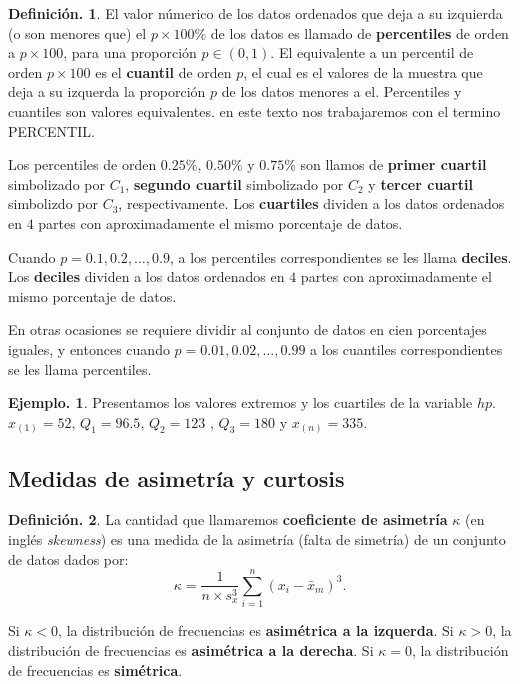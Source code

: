 \documentclass[]{book}
\theoremstyle{definition}
\newtheorem{definition}{Definición.}[chapter]
\theoremstyle{definition}
\newtheorem{example}{Ejemplo.}[chapter]
\theoremstyle{definition}
\theoremstyle{remark}
\begin{document}
\begin{definition}
\protect\hypertarget{def:unnamed-chunk-65}{}{\label{def:unnamed-chunk-65} }
El valor númerico de los datos ordenados que deja a su
izquierda (o son menores que) el \(p \times 100\%\) de los datos es llamado de \textbf{percentiles} de
orden a \(p\times 100\), para una proporción
\(p\in (0,1)\). El equivalente a un percentil de orden
\(p\times 100\) es el \textbf{cuantil} de orden \(p\), el cual es
el
valores de la muestra que deja a su izquerda la
proporción \(p\) de los datos menores a el. Percentiles y
cuantiles son valores equivalentes. en este texto nos
trabajaremos con el termino PERCENTIL.

Los percentiles de orden \(0.25\%\), \(0.50\%\) y \(0.75\%\)
son llamos de \textbf{primer cuartil} simbolizado por \(C_1\),
\textbf{segundo cuartil} simbolizado por \(C_2\) y \textbf{tercer
cuartil} simbolizdo por \(C_3\), respectivamente. Los
\textbf{cuartiles}
dividen a los datos ordenados en \(4\) partes con
aproximadamente el
mismo porcentaje de datos.

Cuando \(p = 0.1, 0.2, \ldots , 0.9\), a los percentiles
correspondientes se les llama \textbf{deciles}. Los
\textbf{deciles} dividen a
los datos ordenados en \(4\) partes con aproximadamente el
mismo
porcentaje de datos.

En otras ocasiones se requiere dividir al conjunto de
datos en cien porcentajes iguales, y
entonces cuando \(p = 0.01, 0.02, \ldots , 0.99\) a los
cuantiles correspondientes se les llama
percentiles.
\end{definition}

\begin{example}
\protect\hypertarget{exm:unnamed-chunk-66}{}{\label{exm:unnamed-chunk-66} }Presentamos los valores extremos y los cuartiles de la
variable \(hp\).
\(x_{(1)}= 52\), \(Q_1= 96.5\), \(Q_2 = 123\) , \(Q_3 = 180\) y
\(x_{(n)}= 335\).
\end{example}

\hypertarget{medidas-de-asimetruxeda-y-curtosis}{%
\subsection{Medidas de asimetría y curtosis}\label{medidas-de-asimetruxeda-y-curtosis}}

\begin{definition}
\protect\hypertarget{def:unnamed-chunk-67}{}{\label{def:unnamed-chunk-67} }La cantidad que llamaremos \textbf{coeficiente de asimetría}
\(\kappa\) (en inglés \emph{skewness})
es una medida de la asimetría (falta de simetría) de un
conjunto de datos dados por:
\[ \kappa = \frac{1}{n \times s_x^3} \sum_{i=1}^n (x_i -
                                      \bar{x}_m)^3. \]

Si \(\kappa < 0\), la distribución de frecuencias es
\textbf{asimétrica a la izquerda}. Si \(\kappa >0\),
la distribución de frecuencias es \textbf{asimétrica a la
derecha}. Si \(\kappa=0\), la distribución de
frecuencias es \textbf{simétrica}.
\end{definition}
\end{document}
